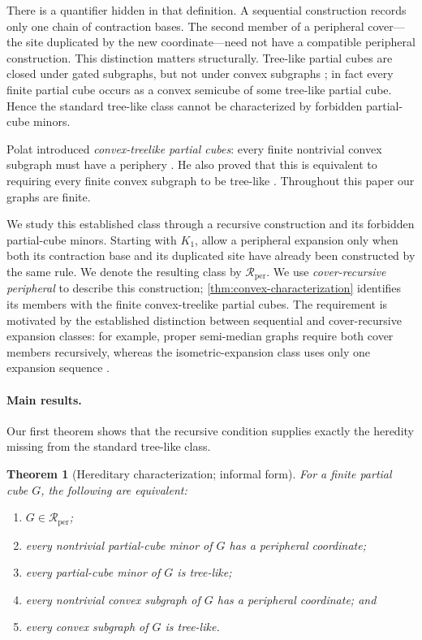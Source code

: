 \documentclass[11pt]{article}
\newtheorem{theorem}{Theorem}[section]
\theoremstyle{definition}
\theoremstyle{remark}
\newcommand{\Rper}{\mathcal R_{\mathrm{per}}}
\begin{document}
There is a quantifier hidden in that definition.  A sequential construction
records only one chain of contraction bases.  The second member of a
peripheral cover---the site duplicated by the new coordinate---need not have
a compatible peripheral construction.  This distinction matters
structurally.  Tree-like partial cubes are closed under gated subgraphs, but
not under convex subgraphs \cite{Polat12treelike,Gologranc14treehamming}; in fact every
finite partial cube occurs as a convex semicube of some tree-like partial
cube.  Hence the standard tree-like class cannot be characterized by
forbidden partial-cube minors.

Polat introduced \emph{convex-treelike partial cubes}: every finite
nontrivial convex subgraph must have a periphery
\cite[Definition~5.5]{Polat12treelike}. He also proved that this is
equivalent to requiring every finite convex subgraph to be tree-like
\cite[Proposition~5.6]{Polat12treelike}. Throughout this paper our graphs
are finite.

We study this established class through a recursive construction and its
forbidden partial-cube minors. Starting with \(K_1\), allow a
peripheral expansion only when both its contraction base and its duplicated
site have already been constructed by the same rule.  We denote the resulting
class by \(\Rper\).
We use \emph{cover-recursive peripheral} to describe this construction;
\cref{thm:convex-characterization} identifies its members with the finite
convex-treelike partial cubes. The
requirement is motivated by the established distinction between sequential
and cover-recursive expansion classes: for example,
proper semi-median graphs require both cover members recursively, whereas
the isometric-expansion class uses only one expansion sequence
\cite{journals/jgt/BresarIKMS02}.

\paragraph{Main results.}
Our first theorem shows that the recursive condition supplies exactly the
heredity missing from the standard tree-like class.

\begin{theorem}[Hereditary characterization; informal form]
\label{thm:intro-characterization}
For a finite partial cube \(G\), the following are equivalent:
\begin{enumerate}[label=\textup{(\roman*)}]
  \item \(G\in\Rper\);
  \item every nontrivial partial-cube minor of \(G\) has a peripheral
        coordinate;
  \item every partial-cube minor of \(G\) is tree-like;
  \item every nontrivial convex subgraph of \(G\) has a peripheral
        coordinate; and
  \item every convex subgraph of \(G\) is tree-like.
\end{enumerate}
\end{theorem}
\end{document}
